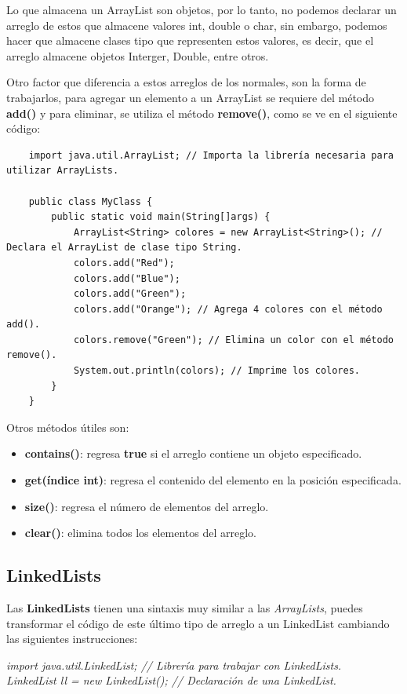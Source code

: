 Lo que almacena un ArrayList son objetos, por lo tanto, no podemos declarar un arreglo de estos que almacene valores int, double o char, sin embargo, podemos hacer que almacene clases tipo que representen estos valores, es decir, que el arreglo almacene objetos Interger, Double, entre otros.

Otro factor que diferencia a estos arreglos de los normales, son la forma de trabajarlos, para agregar un elemento a un ArrayList se requiere del método \textbf{add()} y para eliminar, se utiliza el método \textbf{remove()}, como se ve en el siguiente código:
\begin{lstlisting}
    import java.util.ArrayList; // Importa la librería necesaria para utilizar ArrayLists.
    
    public class MyClass {
        public static void main(String[]args) {
            ArrayList<String> colores = new ArrayList<String>(); // Declara el ArrayList de clase tipo String.
            colors.add("Red");
            colors.add("Blue");
            colors.add("Green");
            colors.add("Orange"); // Agrega 4 colores con el método add().
            colors.remove("Green"); // Elimina un color con el método remove().
            System.out.println(colors); // Imprime los colores.
        }
    }
\end{lstlisting}

Otros métodos útiles son:
\begin{itemize}
    \item \textbf{contains()}: regresa \textbf{true} si el arreglo contiene un objeto especificado.
    \item \textbf{get(índice int)}: regresa el contenido del elemento en la posición especificada. 
    \item \textbf{size()}: regresa el número de elementos del arreglo.
    \item \textbf{clear()}: elimina todos los elementos del arreglo.
\end{itemize}


\subsection{LinkedLists}
\hspace{0.55cm}Las \textbf{LinkedLists} tienen una sintaxis muy similar a las \textit{ArrayLists}, puedes transformar el código de este último tipo de arreglo a un LinkedList cambiando las siguientes instrucciones:
\begin{center}
	\textit{
		import java.util.LinkedList; // Librería para trabajar con LinkedLists. \\
		LinkedList ll = new LinkedList(); // Declaración de una LinkedList.
		}
\end{center}

